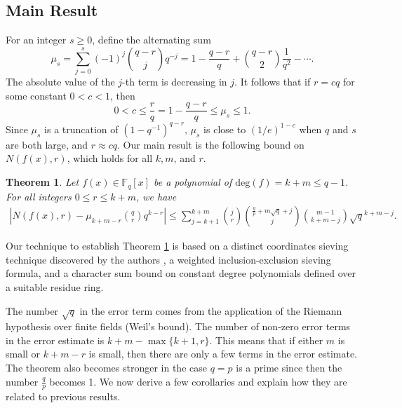 \documentclass[reqno]{amsart}
\newtheorem{thm}{Theorem}[section]
\theoremstyle{remark}
\numberwithin{equation}{section}
\newcommand{\f}{\mathbb{F}_q}
\begin{document}
\subsection{Main Result}

For an integer $s\geq 0$, define the alternating sum
$$\mu_s=\displaystyle{\sum_{j=0}^{s} (-1)^{j}{q-r \choose j} q^{-j}} = 1 - \frac{q-r}{q} + {q-r\choose 2}\frac{1}{q^2}-\cdots.$$
The absolute value of the $j$-th term is decreasing in $j$. It follows that if $r =cq$ for some constant $0<c<1$, then
   $$0< c \leq \frac{r}{q} = 1 - \frac{q-r}{q} \leq \mu_{s} \leq 1.$$
    Since $\mu_s$ is a truncation of $(1-q^{-1})^{q-r}$, $\mu_{s}$ is close to $(1/e)^{1-c}$ when $q$ and $s$ are both large, and $r\approx cq$.
Our main result is the following bound on $N(f(x), r)$,  which holds for all $k, m$, and $r$.


\begin{thm}\label{Theorem1.5}
Let $f(x) \in \f [x]$ be a polynomial of $\text{deg}(f)=k+m\leq q-1$.
For all integers $0\leq r\leq k+m$, we have
\begin{align*}
\left|N(f(x), r)-\mu_{k+m-r}{q \choose r}q^{k-r}
\right|\leq \sum_{j=k+1}^{k+m}  {j \choose r}{\frac {q}p+m\sqrt{q}+j \choose j}{m-1 \choose k+m-j} \sqrt{q}^{k+m-j}.
 \end{align*}
\end{thm}
Our technique to establish Theorem \ref{Theorem1.5} is
based on a distinct coordinates sieving technique discovered by the authors \cite{LW2, LW3},  a weighted inclusion-exclusion sieving formula, and a character sum bound on constant degree polynomials defined over a suitable residue ring.

The number $\sqrt{q}$ in the error term comes from the application of the Riemann hypothesis over finite fields (Weil's bound).
The number of non-zero error terms in the error estimate is $k+m -\max \{k+1, r \}$. This means that if either $m$ is small
or $k+m-r$ is small, then there are only a few terms in the error estimate. The theorem also becomes stronger in the case $q=p$ is a prime since then the number $\frac {q}p $ becomes 1.
We now derive a few corollaries and explain how they are related to previous results.
\end{document}

